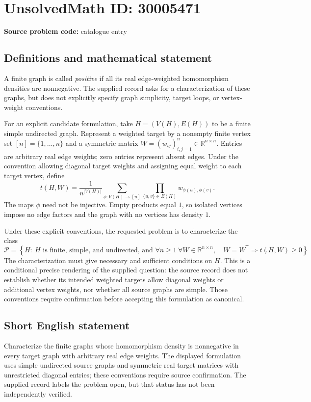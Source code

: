 \documentclass[11pt]{article}
\newcommand{\R}{\mathbb{R}}
\begin{document}
\section*{UnsolvedMath ID: 30005471}
\textbf{Source problem code:} catalogue entry
\subsection{Definitions and mathematical statement}
A finite graph is called \emph{positive} if all its real edge-weighted homomorphism densities are nonnegative. The supplied record asks for a characterization of these graphs, but does not explicitly specify graph simplicity, target loops, or vertex-weight conventions.

For an explicit candidate formulation, take \(H=(V(H),E(H))\) to be a finite simple undirected graph. Represent a weighted target by a nonempty finite vertex set \([n]=\{1,\ldots,n\}\) and a symmetric matrix \(W=(w_{ij})_{i,j=1}^{n}\in\R^{n\times n}\). Entries are arbitrary real edge weights; zero entries represent absent edges. Under the convention allowing diagonal target weights and assigning equal weight to each target vertex, define
\[
 t(H,W)=\frac{1}{n^{|V(H)|}}\sum_{\phi:V(H)\to[n]}\prod_{\{u,v\}\in E(H)}w_{\phi(u),\phi(v)}.
\]
The maps \(\phi\) need not be injective. Empty products equal \(1\), so isolated vertices impose no edge factors and the graph with no vertices has density \(1\).

Under these explicit conventions, the requested problem is to characterize the class
\[
 \mathcal P=\left\{H:\ H\text{ is finite, simple, and undirected, and }\forall n\geq1\ \forall W\in\R^{n\times n},\quad W=W^{\mathsf T}\Longrightarrow t(H,W)\geq0\right\}.
\]
The characterization must give necessary and sufficient conditions on \(H\). This is a conditional precise rendering of the supplied question: the source record does not establish whether its intended weighted targets allow diagonal weights or additional vertex weights, nor whether all source graphs are simple. Those conventions require confirmation before accepting this formulation as canonical.
\subsection{Short English statement}
Characterize the finite graphs whose homomorphism density is nonnegative in every target graph with arbitrary real edge weights. The displayed formulation uses simple undirected source graphs and symmetric real target matrices with unrestricted diagonal entries; these conventions require source confirmation. The supplied record labels the problem open, but that status has not been independently verified.
\end{document}
